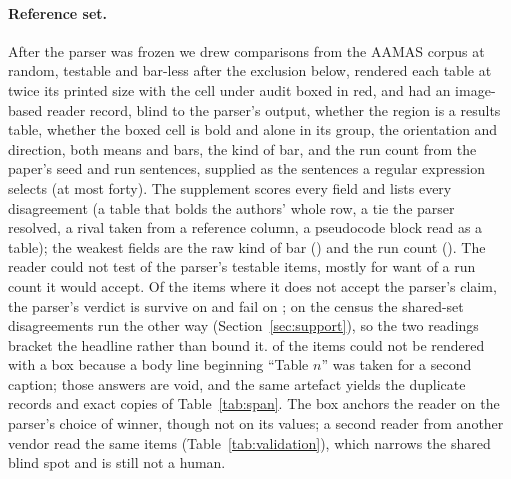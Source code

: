 \documentclass[sigconf,anonymous]{aamas}
\begin{document}
\paragraph{Reference set.} After the parser was frozen we drew \nGDrawnN{}
comparisons from the AAMAS corpus at random, \nGTestableN{} testable and
\nGNoBarN{} bar-less after the exclusion below, rendered each table at twice
its printed size with the cell under audit boxed in red, and had an
image-based reader record, blind to the parser's output, whether the
region is a results table, whether the boxed cell is bold and alone in its
group, the orientation and direction, both means and bars, the kind of
bar, and the run count from the paper's seed and run sentences, supplied
as the sentences a regular expression selects (at most forty). The
supplement scores every field and lists every disagreement (a table that
bolds the authors' whole row, a tie the parser resolved, a rival taken
from a reference column, a pseudocode block read as a table); the
weakest fields are the raw kind of bar (\nGDispTypeFrac{}) and the run
count (\nGNRunsFrac{}). The reader could not test \nGUntestableN{} of the
parser's testable items, mostly for want of a run count it would accept.
Of the \nGDisagreeN{} items where it does not accept the parser's claim,
the parser's verdict is survive on \nGDisagreeSurvive{} and fail on
\nGDisagreeFail{}; on the census the shared-set disagreements run the
other way (Section~\ref{sec:support}), so the two readings bracket the
headline rather than bound it. \nGUnboxedN{} of the \nGDrawnN{} items
could not be rendered with a box because a body line beginning ``Table
$n$'' was taken for a second caption; those answers are void, and the
same artefact yields the duplicate records and exact copies of
Table~\ref{tab:span}. The box anchors the reader on the parser's choice
of winner, though not on its values; a second reader from another vendor
read the same items (Table~\ref{tab:validation}), which narrows the
shared blind spot and is still not a human.
\end{document}

